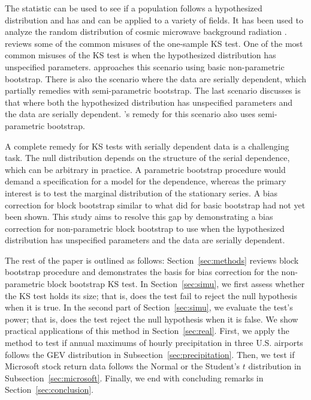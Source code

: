 \documentclass[12pt, titlepage, letterpaper]{article}
\begin{document}
{The statistic 
can be used to see if a population follows a hypothesized distribution and has 
and can be applied to a variety of fields. It has
been used to analyze the random distribution of cosmic microwave background 
radiation \citep{naess2012application}. \citet{zeimbekakis2022misuses} reviews
some of the common misuses of the one-sample KS test. One of the most common 
misuses of the KS test is when
the hypothesized distribution has unspecified parameters. 
\citet{babu2004goodness} approaches this scenario using basic 
non-parametric bootstrap. There is also the scenario where the data are serially
dependent, which \citet{zeimbekakis2022misuses} partially remedies with 
semi-parametric
bootstrap. The last scenario \citet{zeimbekakis2022misuses} discusses is that
where both the hypothesized 
distribution has unspecified parameters and the data are 
serially dependent. \citet{zeimbekakis2022misuses}'s remedy for
this scenario also uses semi-parametric bootstrap.


A complete remedy for KS tests with serially dependent data is
a challenging task. The null distribution depends on the structure of the serial
dependence, which can be arbitrary in practice. A parametric bootstrap procedure
would demand a specification for a model for the dependence, whereas the primary 
interest
is to test the marginal distribution of the stationary series. A bias 
correction
for block bootstrap similar to what \citet{babu2004goodness} did for basic
bootstrap had not yet been shown.  This study aims to resolve this gap by 
demonstrating a bias 
correction
for non-parametric block bootstrap to use when the hypothesized distribution
has unspecified parameters and the data are serially dependent.


The rest of the paper is outlined as follows: Section~\ref{sec:methods} reviews
block bootstrap procedure and demonstrates the basis for bias correction for
the non-parametric block bootstrap KS test. In Section~\ref{sec:simu}, we first 
assess whether the KS
test holds its size; that is, does the test fail to reject the null hypothesis
when it is true. In the second part of Section~\ref{sec:simu}, we 
evaluate the 
test's power; that is, does the test reject the null hypothesis when it is 
false. We show practical applications of this method in Section~\ref{sec:real}.
First, we apply the method to test if annual maximums of hourly precipitation
in three U.S. airports follows the GEV distribution in 
Subsection~\ref{sec:precipitation}.
Then, we test if Microsoft stock return data follows the Normal or the Student's
$t$ distribution in Subsection~\ref{sec:microsoft}.
Finally, we end with 
concluding remarks in Section~\ref{sec:conclusion}.


}
\end{document}
